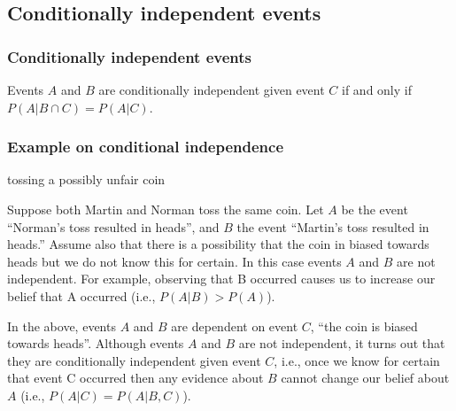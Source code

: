 \subsection{Conditionally independent events}

\begin{frame}
    \frametitle{Conditionally independent events}

    \begin{probDef}
        Events $A$ and $B$ are conditionally independent given event $C$ if and
        only if $P(A|B\cap C)=P(A|C)$.
    \end{probDef}

\end{frame}

\begin{frame}
    \frametitle{Example on conditional independence}

    \scriptsize
    \begin{manualProbExample}{tossing a possibly unfair coin}

        Suppose both Martin and Norman toss the same coin. Let $A$ be the event
        ``Norman's toss resulted in heads'', and $B$ the event ``Martin's toss
        resulted in heads.'' Assume also that there is a possibility that the
        coin in biased towards heads but we do not know this for certain.  In
        this case events $A$ and $B$ are not independent. For example, observing
        that B occurred causes us to increase our belief that A occurred (i.e.,
        $P(A|B)>P(A)$).

        In the above, events $A$ and $B$ are dependent on event $C$, ``the coin
        is biased towards heads''. Although events $A$ and $B$ are not
        independent, it turns out that they are conditionally independent given
        event $C$, i.e., once we know for certain that event C occurred then
        any evidence about $B$ cannot change our belief about $A$ (i.e.,
        $P(A|C) = P(A|B,C)$).

    \end{manualProbExample}
    \normalsize

\end{frame}

